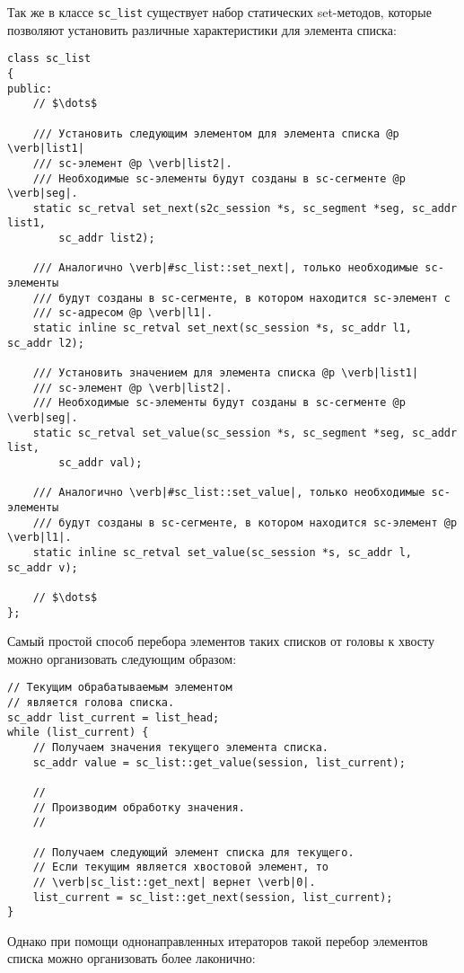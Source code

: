 Так же в классе \lstinline|sc_list| существует набор статических
set-методов, которые позволяют установить различные характеристики для
элемента списка:

\begin{lstlisting}[texcl]
class sc_list
{
public:
    // $\dots$

    /// Установить следующим элементом для элемента списка @p \verb|list1|
    /// sc-элемент @p \verb|list2|.
    /// Необходимые sc-элементы будут созданы в sc-сегменте @p \verb|seg|.
    static sc_retval set_next(s2c_session *s, sc_segment *seg, sc_addr list1,
        sc_addr list2);

    /// Аналогично \verb|#sc_list::set_next|, только необходимые sc-элементы
    /// будут созданы в sc-сегменте, в котором находится sc-элемент c
    /// sc-адресом @p \verb|l1|.
    static inline sc_retval set_next(sc_session *s, sc_addr l1, sc_addr l2);

    /// Установить значением для элемента списка @p \verb|list1|
    /// sc-элемент @p \verb|list2|.
    /// Необходимые sc-элементы будут созданы в sc-сегменте @p \verb|seg|.
    static sc_retval set_value(sc_session *s, sc_segment *seg, sc_addr list,
        sc_addr val);

    /// Аналогично \verb|#sc_list::set_value|, только необходимые sc-элементы
    /// будут созданы в sc-сегменте, в котором находится sc-элемент @p \verb|l1|.
    static inline sc_retval set_value(sc_session *s, sc_addr l, sc_addr v);

    // $\dots$
};
\end{lstlisting}

Самый простой способ перебора элементов таких списков от головы к
хвосту можно организовать следующим образом:

\begin{lstlisting}[texcl]
// Текущим обрабатываемым элементом
// является голова списка.
sc_addr list_current = list_head;
while (list_current) {
    // Получаем значения текущего элемента списка.
    sc_addr value = sc_list::get_value(session, list_current);

    //
    // Производим обработку значения.
    //

    // Получаем следующий элемент списка для текущего.
    // Если текущим является хвостовой элемент, то
    // \verb|sc_list::get_next| вернет \verb|0|.
    list_current = sc_list::get_next(session, list_current);
}
\end{lstlisting}

Однако при помощи однонаправленных итераторов такой перебор элементов
списка можно организовать более лаконично:

